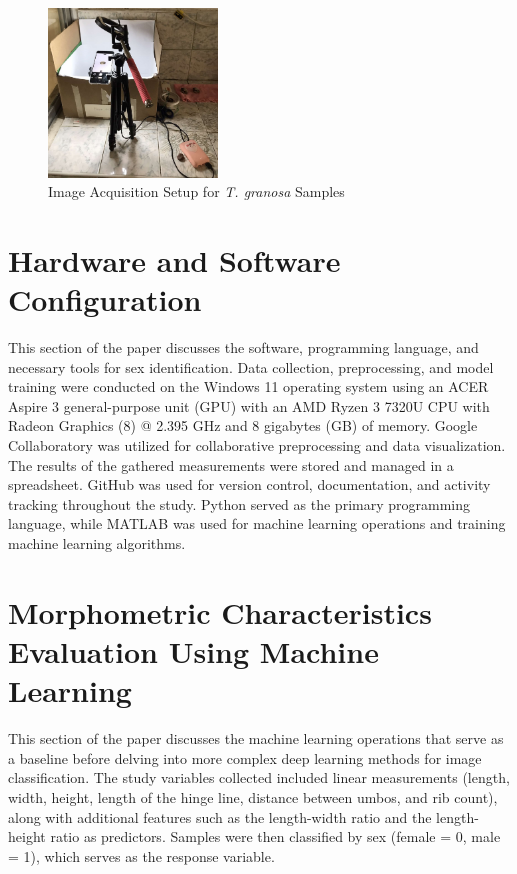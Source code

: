 \begin{figure}[!htbp]
	\centering
	\includegraphics[width=0.4\textwidth]{figures/setup.jpg}
	\caption{Image Acquisition Setup for \textit{T. granosa} Samples}
	\label{fig: setup}
\end{figure}

\section{Hardware and Software Configuration}
This section of the paper discusses the software, programming language, and necessary tools for sex identification. Data collection, preprocessing, and model training were conducted on the Windows 11 operating system using an ACER Aspire 3 general-purpose unit (GPU) with an AMD Ryzen 3 7320U CPU with Radeon Graphics (8) @ 2.395 GHz and 8 gigabytes (GB) of memory. Google Collaboratory was utilized for collaborative preprocessing and data visualization. The results of the gathered measurements were stored and managed in a spreadsheet. GitHub was used for version control, documentation, and activity tracking throughout the study. Python served as the primary programming language, while MATLAB was used for machine learning operations and training machine learning algorithms.


\section{Morphometric Characteristics Evaluation Using Machine Learning }
\label{sec:ml models}

This section of the paper discusses the machine learning operations that serve as a baseline before delving into more complex deep learning methods for image classification. The study variables collected included linear measurements (length, width, height, length of the hinge line, distance between umbos, and rib count), along with additional features such as the length-width ratio and the length-height ratio as predictors. Samples were then classified by sex (female = 0, male = 1), which serves as the response variable.

